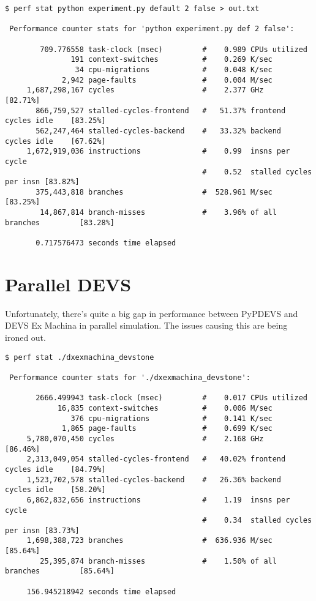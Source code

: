 \documentclass[10pt,a4paper]{report}
\begin{document}
\begin{Verbatim}[fontsize=\small]
$ perf stat python experiment.py default 2 false > out.txt

 Performance counter stats for 'python experiment.py def 2 false':

        709.776558 task-clock (msec)         #    0.989 CPUs utilized          
               191 context-switches          #    0.269 K/sec                  
                34 cpu-migrations            #    0.048 K/sec                  
             2,942 page-faults               #    0.004 M/sec                  
     1,687,298,167 cycles                    #    2.377 GHz                     [82.71%]
       866,759,527 stalled-cycles-frontend   #   51.37% frontend cycles idle    [83.25%]
       562,247,464 stalled-cycles-backend    #   33.32% backend  cycles idle    [67.62%]
     1,672,919,036 instructions              #    0.99  insns per cycle        
                                             #    0.52  stalled cycles per insn [83.82%]
       375,443,818 branches                  #  528.961 M/sec                   [83.25%]
        14,867,814 branch-misses             #    3.96% of all branches         [83.28%]

       0.717576473 seconds time elapsed
\end{Verbatim}

\section{Parallel DEVS}
Unfortunately, there's quite a big gap in performance between PyPDEVS and DEVS Ex Machina in parallel simulation. The issues causing this are being ironed out.
\begin{Verbatim}[fontsize=\small]
$ perf stat ./dxexmachina_devstone 

 Performance counter stats for './dxexmachina_devstone':

       2666.499943 task-clock (msec)         #    0.017 CPUs utilized          
            16,835 context-switches          #    0.006 M/sec                  
               376 cpu-migrations            #    0.141 K/sec                  
             1,865 page-faults               #    0.699 K/sec                  
     5,780,070,450 cycles                    #    2.168 GHz                     [86.46%]
     2,313,049,054 stalled-cycles-frontend   #   40.02% frontend cycles idle    [84.79%]
     1,523,702,578 stalled-cycles-backend    #   26.36% backend  cycles idle    [58.20%]
     6,862,832,656 instructions              #    1.19  insns per cycle        
                                             #    0.34  stalled cycles per insn [83.73%]
     1,698,388,723 branches                  #  636.936 M/sec                   [85.64%]
        25,395,874 branch-misses             #    1.50% of all branches         [85.64%]

     156.945218942 seconds time elapsed
\end{Verbatim}
\end{document}
